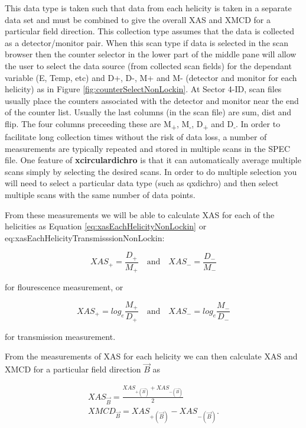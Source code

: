 \documentclass[12pt,letterpaper, openany]{book}
\begin{document}
\begin{appendices}
This data type is taken such that data from each helicity is taken in a separate
data set and must be combined to give the overall XAS and XMCD for a particular
field direction.  This collection type assumes that the data is collected as a
detector/monitor pair.  When this scan type if data is selected in the scan
browser then the counter selector in the lower part of the middle pane will
allow the user to select the data source (from collected scan fields) for the
dependant variable (E, Temp, etc) and D+, D-, M+ and M- (detector and monitor
for each helicity) as in Figure \ref{fig:counterSelectNonLockin}.  At Sector
4-ID, scan files usually place the counters associated with the detector and
monitor near the end of the counter list.  Usually the last columns (in the scan
file) are sum, dist and flip.  The four columns preceeding these are
M\textsubscript{+}, M\textsubscript{-}, D\textsubscript{+} and
D\textsubscript{-}.  In order to facilitate long collection times without the
risk of data loss, a number of measurements are typically repeated and stored in
multiple scans in the SPEC file.  One feature of \textbf{xcirculardichro} is
that it can automatically average multiple scans simply by selecting the desired
scans.  In order to do multiple selection you will need to select a particular
data type (such as qxdichro) and then select multiple scans with the same number
of data points.

From these measurements we will be able to calculate XAS
for each of the helicities as Equation \ref{eq:xasEachHelicityNonLockin} or
{eq:xasEachHelicityTransmisssionNonLockin}:

\begin{equation}
XAS_+ = \frac{D_+}{M_+} \quad\mathrm{   and   }\quad XAS_- = \frac{D_-}{M_-}
\label{eq:xasEachHelicityNonLockin}
\end{equation}

for flourescence measurement, or

\begin{equation}
XAS_+ = log_e\frac{M_+}{D_+} \quad\mathrm{   and   }\quad XAS_-
= log_e\frac{M_-}{D_-}
\label{eq:xasEachHelicityTransmisssionNonLockin}
\end{equation}

for transmission measurement.

From the measurements of XAS for each helicity we can then calculate XAS and
XMCD for a particular field direction $\vec{B}$ as 

\begin{equation}
\begin{split}
XAS_{\vec{B}} = \frac{XAS_{+(\vec{B})} + XAS_{-(\vec{B})}}{2} 
\\
 XMCD_{\vec{B}} = XAS_{+(\vec{B})} - XAS_{-(\vec{B})} .
\label{eq:xasFieldDirectionFlourecenceNonLockin}
\end{split}
\end{equation}


\end{appendices}
\end{document}
